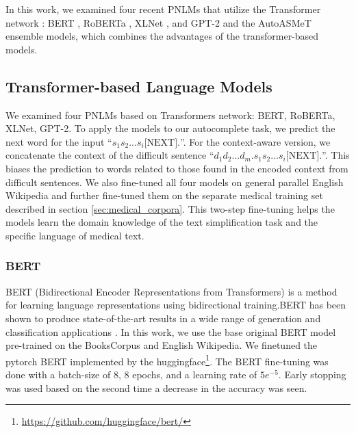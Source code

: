 \documentclass[11pt]{article}
\begin{document}
In this work, we examined four recent PNLMs that utilize the Transformer network \cite{vaswani2017attention}: BERT \cite{devlin2018bert}, RoBERTa \cite{liu2019roberta}, XLNet \cite{yang2019xlnet}, and GPT-2 \cite{radford2019language} and the AutoASMeT ensemble models, which combines the advantages of the transformer-based models.

\subsection{Transformer-based Language Models}


We examined four PNLMs based on Transformers network: BERT, RoBERTa, XLNet, GPT-2. To apply the models to our autocomplete task, we predict the next word for the input ``$s_1 s_2 ... s_i \mbox{[NEXT]} .$''. For the context-aware version, we concatenate the context of the difficult sentence
``$d_1 d_2 ... d_m. s_1 s_2 ... s_i \mbox{[NEXT]} .$''. This biases the prediction to words related to those found in the encoded context from difficult sentences. We also fine-tuned all four models on general parallel English Wikipedia \cite{kauchak2013improving} and further fine-tuned them on the separate medical training set described in section \ref{sec:medical_corpora}. This two-step fine-tuning helps the models learn the domain knowledge of the text simplification task and the specific language of medical text.

\subsubsection{BERT} 

BERT (Bidirectional Encoder Representations from Transformers) is a method for learning language representations using bidirectional training.BERT has been shown to produce state-of-the-art results in a wide range of generation and classification applications \cite{devlin2018bert}. In this work, we use the base original BERT model pre-trained on the BooksCorpus \cite{zhu2015aligning} and English Wikipedia. We finetuned the pytorch BERT implemented by the huggingface\footnote{\url{https://github.com/huggingface/bert/}}. The BERT fine-tuning was done with a batch-size of 8, 8 epochs, and a learning rate of $5e^{-5}$. Early stopping was used based on the second time a decrease in the accuracy was seen.
\end{document}
